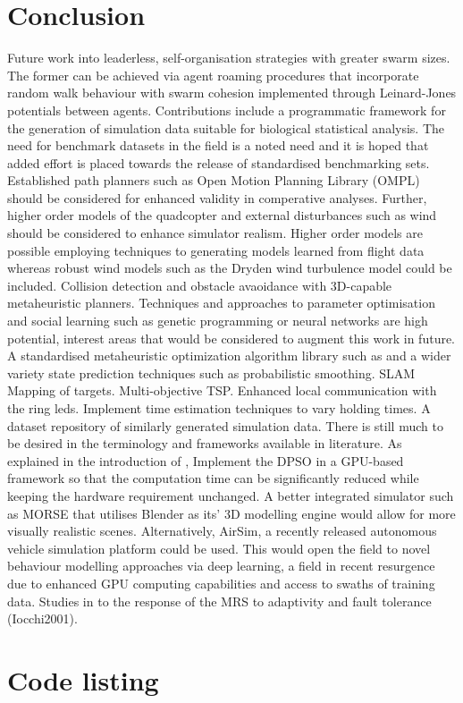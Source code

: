 \documentclass{report}
\begin{document}
\chapter{Conclusion} \label{conclusion}
Future work into leaderless, self-organisation strategies with greater swarm sizes. The former can be achieved via agent roaming procedures that incorporate random walk behaviour with swarm cohesion implemented through Leinard-Jones potentials between agents.
Contributions include a programmatic framework for the generation of simulation data suitable for biological statistical analysis. The need for benchmark datasets in the field is a noted need and it is hoped that added effort is placed towards the release of standardised benchmarking sets.
Established path planners such as Open Motion Planning Library (OMPL) \cite{Sucan2012} should be considered for enhanced validity in comperative analyses. Further, higher order models of the quadcopter and external disturbances such as wind should be considered to enhance simulator realism. Higher order models are possible employing techniques to generating models learned from flight data \cite{Symington2014} whereas robust wind models such as the Dryden wind turbulence model \cite{Dryden} could be included. Collision detection and obstacle avaoidance with 3D-capable metaheuristic planners. Techniques and approaches to parameter optimisation and social learning such as genetic programming or neural networks are high potential, interest areas that would be considered to augment this work in future.
A standardised metaheuristic optimization algorithm library such as \cite{James2018} and a wider variety state prediction techniques such as probabilistic smoothing.
SLAM Mapping of targets.
Multi-objective TSP.
Enhanced local communication with the ring leds.
Implement time estimation techniques to vary holding times.
A dataset repository of similarly generated simulation data.
There is still much to be desired in the terminology and frameworks available in literature.
As explained in the introduction of \cite{Phung2017}, Implement the DPSO in a GPU-based framework so that the computation time can be significantly reduced while keeping the hardware requirement unchanged.
A better integrated simulator such as MORSE that utilises Blender as its' 3D modelling engine would allow for more visually realistic scenes. Alternatively, AirSim, a recently released autonomous vehicle simulation platform could be used. This would open the field to novel behaviour modelling approaches via deep learning, a field in recent resurgence due to enhanced GPU computing capabilities and access to swaths of training data.
Studies in to the response of the MRS to adaptivity and fault tolerance (Iocchi2001).

\appendix


\chapter{Code listing}
\end{document}
